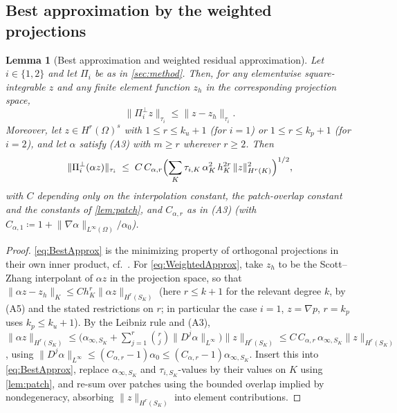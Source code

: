 \documentclass[11pt]{article}
\newtheorem{lemma}[theorem]{Lemma}
\theoremstyle{remark}
\newcommand{\norm}[1]{\lVert #1 \rVert}
\begin{document}
\subsection{Best approximation by the weighted projections}

\begin{lemma}[Best approximation and weighted residual approximation]
\label{lem:bestapprox}
Let $i \in \{1,2\}$ and let $\Pi_i$ be as in \cref{sec:method}. Then, for any
elementwise square-integrable $z$ and any finite element function $z_h$ in the
corresponding projection space,
\begin{equation}
  \label{eq:BestApprox}
  \norm{\Pi_i^{\perp} z}_{\tau_i} \le \norm{z - z_h}_{\tau_i}.
\end{equation}
Moreover, let $z \in H^{r}(\Omega)^s$ with $1 \le r \le k_u+1$ (for $i = 1$) or
$1 \le r \le k_p + 1$ (for $i = 2$), and let $\alpha$ satisfy \textup{(A3)} with
$m \ge r$ wherever $r \ge 2$. Then
\begin{equation}
  \label{eq:WeightedApprox}
  \norm{\Pi_i^{\perp}(\alpha z)}_{\tau_i}
  \;\le\;
  C\, C_{\alpha,r}
  \Bigl( \sum_K \tau_{i,K}\,\alpha_K^2\, h_K^{2r}\,\norm{z}_{H^{r}(K)}^2 \Bigr)^{1/2},
\end{equation}
with $C$ depending only on the interpolation constant, the patch-overlap constant and
the constants of \cref{lem:patch}, and $C_{\alpha,r}$ as in \textup{(A3)}
(with $C_{\alpha,1} \coloneqq 1 + \norm{\nabla\alpha}_{L^\infty(\Omega)}/\alpha_0$).
\end{lemma}

\begin{proof}
\cref{eq:BestApprox} is the minimizing property of orthogonal projections in their own
inner product, cf.~\cite[Remark~4]{Codina2008}. For \cref{eq:WeightedApprox}, take
$z_h$ to be the Scott--Zhang interpolant of $\alpha z$ in the projection space, so that
$\norm{\alpha z - z_h}_{K} \le C h_K^{r} \norm{\alpha z}_{H^{r}(S_K)}$
(here $r \le k+1$ for the relevant degree $k$, by (A5) and the stated restrictions on
$r$; in particular the case $i=1$, $z = \nabla p$, $r = k_p$ uses $k_p \le k_u+1$).
By the Leibniz rule and (A3),
$\norm{\alpha z}_{H^{r}(S_K)}
\le \bigl( \alpha_{\infty,S_K} + \sum_{j=1}^{r}\binom{r}{j}\norm{D^j\alpha}_{L^\infty}\bigr)
\norm{z}_{H^{r}(S_K)}
\le C\,C_{\alpha,r}\,\alpha_{\infty,S_K}\norm{z}_{H^{r}(S_K)}$,
using $\norm{D^j\alpha}_{L^\infty} \le (C_{\alpha,r}-1)\alpha_0 \le
(C_{\alpha,r}-1)\alpha_{\infty,S_K}$. Insert this into \cref{eq:BestApprox}, replace
$\alpha_{\infty,S_K}$ and $\tau_{i,S_K}$-values by their values on $K$ using
\cref{lem:patch}, and re-sum over patches using the bounded overlap implied by
nondegeneracy, absorbing $\norm{z}_{H^r(S_K)}$ into element contributions.
\end{proof}
\end{document}
